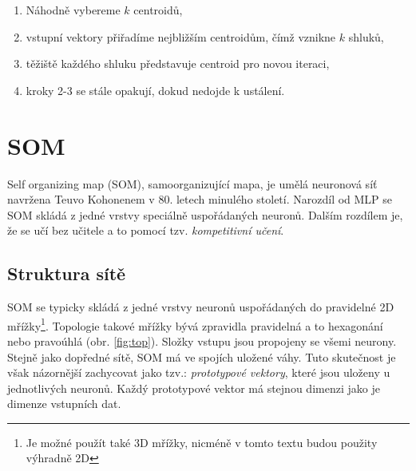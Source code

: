 \documentclass[thesis=M,czech]{FITthesis}[2012/06/26]
\begin{document}
\begin{enumerate}
\item Náhodně vybereme $k$ centroidů,
\item  vstupní vektory přiřadíme nejbližším centroidům, čímž vznikne $k$ shluků,
\item těžiště každého shluku představuje centroid pro novou iteraci,
\item kroky 2-3 se stále opakují, dokud nedojde k ustálení.
\end{enumerate}


\section{SOM}
Self organizing map (SOM), samoorganizující mapa, je umělá neuronová síť navržena Teuvo Kohonenem v 80. letech minulého století. Narozdíl od MLP se SOM skládá z jedné vrstvy speciálně uspořádaných neuronů. Dalším rozdílem je, že se učí bez učitele a to pomocí tzv. \textit{kompetitivní učení}.\cite{junkie}

\subsection{Struktura sítě}
SOM se typicky skládá z jedné vrstvy neuronů uspořádaných do pravidelné 2D mřížky\footnote{Je možné použít také 3D mřížky, nicméně v tomto textu budou použity výhradně 2D}. Topologie takové mřížky bývá zpravidla pravidelná a to hexagonání nebo pravoúhlá (obr. \ref{fig:top}). Složky vstupu jsou propojeny se všemi neurony.
Stejně jako dopředné sítě, SOM má ve spojích uložené váhy. Tuto skutečnost je však názornější zachycovat jako tzv.: \textit{prototypové vektory}, které jsou uloženy u jednotlivých neuronů. Každý prototypové vektor  má stejnou dimenzi jako je dimenze vstupních dat.
\end{document}
